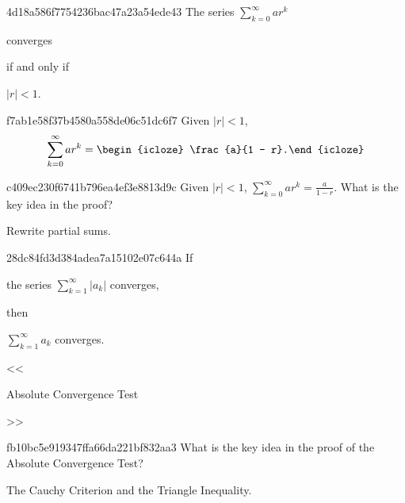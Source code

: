 \begin{note}{4d18a586f7754236bac47a23a54ede43}
    The series \({ \sum_{k=0}^{\infty} ar^{k} }\) \begin{icloze}{2}converges\end{icloze} \begin{icloze}{3}if and only if\end{icloze} \begin{icloze}{1}\({ \left\lvert r \right\rvert < 1 }\).\end{icloze}
\end{note}

\begin{note}{f7ab1e58f37b4580a558de06c51dc6f7}
    Given \({ \left\lvert r \right\rvert < 1 }\),
    \[
        \sum_{k=0}^{\infty} ar^{k} = \begin{icloze}{1}\frac{a}{1 - r}.\end{icloze}
    \]
\end{note}

\begin{note}{c409ec230f6741b796ea4ef3e8813d9c}
    Given \({ \left\lvert r \right\rvert < 1 }\), \({ \sum_{k=0}^{\infty} ar^{k} = \frac{a}{1 - r} }\).
    What is the key idea in the proof?

    \begin{cloze}{1}
        Rewrite partial sums.
    \end{cloze}
\end{note}

\begin{note}{28dc84fd3d384adea7a15102e07c644a}
    If \begin{icloze}{2}the series \({ \sum_{k=1}^{\infty} \left\lvert a_k \right\rvert }\) converges,\end{icloze} then \begin{icloze}{1}\({ \sum_{k=1}^{\infty} a_k }\) converges.\end{icloze}

    \begin{center}
        \tiny
        <<\begin{icloze}{3}Absolute Convergence Test\end{icloze}>>
    \end{center}
\end{note}

\begin{note}{fb10bc5e919347ffa66da221bf832aa3}
    What is the key idea in the proof of the Absolute Convergence Test?

    \begin{cloze}{1}
        The Cauchy Criterion and the Triangle Inequality.
    \end{cloze}
\end{note}

